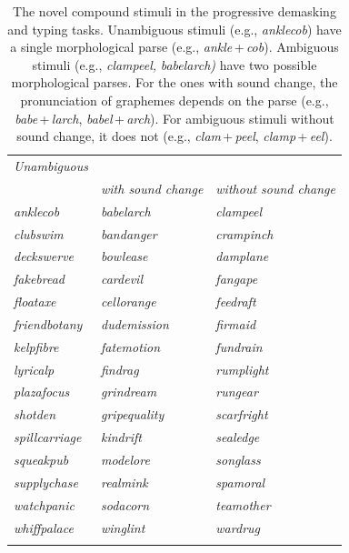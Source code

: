 \documentclass[output=paper]{langsci/langscibook}
\begin{document}
\begin{table}
\caption{\label{tab:libben:2}The novel compound stimuli in the progressive demasking and typing tasks.  Unambiguous stimuli (e.g., \textit{anklecob}) have a single morphological parse (e.g., \textit{ankle}\,+\,\textit{cob}). Ambiguous stimuli (e.g., \textit{clampeel,} \textit{babelarch)} have two possible morphological parses. For the ones with sound change, the pronunciation of graphemes depends on the parse (e.g., \textit{babe}\,+\,\textit{larch}, \textit{babel}\,+\,\textit{arch}).  For ambiguous stimuli without sound change, it does not (e.g., \textit{clam}\,+\,\textit{peel}, \textit{clamp}\,+\,\textit{eel}).}
\begin{tabular}{*{3}{>{\itshape}l}}
\lsptoprule
{\normalfont Unambiguous} & \multicolumn{2}{c}{{\normalfont Ambiguous}}\\\cmidrule(lr){2-3}
& {\normalfont with sound change} & {\normalfont without sound change}\\\midrule
anklecob & babelarch & clampeel\\
clubswim & bandanger & crampinch\\
deckswerve & bowlease & damplane\\
fakebread & cardevil & fangape\\
floataxe & cellorange & feedraft\\
friendbotany & dudemission & firmaid\\
kelpfibre & fatemotion & fundrain\\
lyricalp & findrag & rumplight\\
plazafocus & grindream & rungear\\
shotden & gripequality & scarfright\\
spillcarriage & kindrift & sealedge\\
squeakpub & modelore & songlass\\
supplychase & realmink & spamoral\\
watchpanic & sodacorn & teamother\\
whiffpalace & winglint & wardrug\\
\lspbottomrule
\end{tabular}
\end{table}
\end{document}
